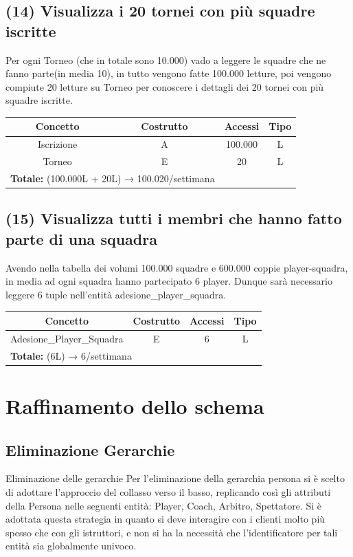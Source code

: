 \documentclass[a4paper,12pt]{report}
\begin{document}
\subsection*{(14)  Visualizza i 20 tornei con più squadre iscritte}
Per ogni Torneo (che in totale sono 10.000) vado a leggere le squadre che ne fanno parte(in media 10), in tutto vengono fatte 100.000 letture, poi vengono compiute 20 letture su Torneo per conoscere i dettagli dei 20 tornei con più squadre iscritte.
\begin{center}
	\begin{tabular}{|c|c|c|c|}
		\hline\rowcolor{pink}
		Concetto & Costrutto & Accessi & Tipo\\
		\hline\hline		
		Iscrizione & A & 100.000 & L\\
		\hline
		Torneo & E & 20 & L\\
		\hline
		\multicolumn{2}{l}{%
			\textbf{Totale:} (100.000L + 20L) → 100.020/settimana} \\
		\hline
	\end{tabular}
\end{center}
\subsection*{(15)  Visualizza tutti i membri che hanno fatto parte di una squadra}
Avendo nella tabella dei volumi 100.000 squadre e 600.000 coppie player-squadra, in media ad ogni squadra hanno partecipato 6 player. Dunque sarà necessario leggere 6 tuple nell'entità adesione\_player\_squadra.
\begin{center}
	\begin{tabular}{|c|c|c|c|}
		\hline\rowcolor{pink}
		Concetto & Costrutto & Accessi & Tipo\\
		\hline\hline		
		Adesione\_Player\_Squadra & E & 6 & L\\
		\hline
		\multicolumn{2}{l}{%
			\textbf{Totale:} (6L) → 6/settimana} \\
		\hline
	\end{tabular}
\end{center}

\section{Raffinamento dello schema}
\subsection*{Eliminazione Gerarchie}
Eliminazione delle gerarchie
Per l’eliminazione della gerarchia persona si è scelto di adottare l’approccio del collasso verso
il basso, replicando così gli attributi della Persona nelle seguenti entità: Player, Coach, Arbitro, Spettatore. 
Si è adottata questa strategia in
quanto si deve interagire con i clienti molto più spesso che con gli istruttori, e non si ha la
necessità che l’identificatore per tali entità sia globalmente univoco.
\end{document}
